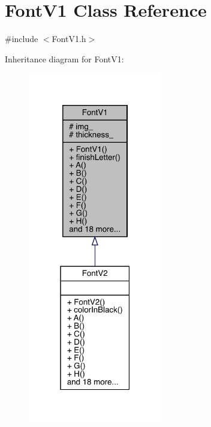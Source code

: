 \hypertarget{class_font_v1}{}\section{Font\+V1 Class Reference}
\label{class_font_v1}


{\ttfamily \#include $<$Font\+V1.\+h$>$}



Inheritance diagram for Font\+V1\+:\nopagebreak
\begin{figure}[H]
\begin{center}
\leavevmode
\includegraphics[width=166pt]{class_font_v1__inherit__graph}
\end{center}
\end{figure}


